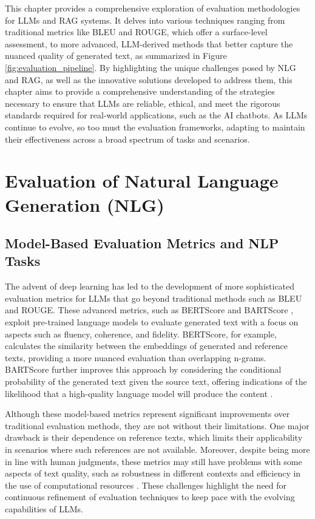 This chapter provides a comprehensive exploration of evaluation methodologies for LLMs and RAG systems. It delves into various techniques ranging from traditional metrics like BLEU and ROUGE, which offer a surface-level assessment, to more advanced, LLM-derived methods that better capture the nuanced quality of generated text, as summarized in Figure \ref{fig:evaluation_pipeline}. By highlighting the unique challenges posed by NLG and RAG, as well as the innovative solutions developed to address them, this chapter aims to provide a comprehensive understanding of the strategies necessary to ensure that LLMs are reliable, ethical, and meet the rigorous standards required for real-world applications, such as the AI chatbots. As LLMs continue to evolve, so too must the evaluation frameworks, adapting to maintain their effectiveness across a broad spectrum of tasks and scenarios.

\section{Evaluation of Natural Language Generation (NLG)}

\subsection{Model-Based Evaluation Metrics and NLP Tasks}

The advent of deep learning has led to the development of more sophisticated evaluation metrics for LLMs that go beyond traditional methods such as BLEU and ROUGE. These advanced metrics, such as BERTScore and BARTScore \cite{zhang2019bertscore, yuan2021bartscore}, exploit pre-trained language models to evaluate generated text with a focus on aspects such as fluency, coherence, and fidelity. BERTScore, for example, calculates the similarity between the embeddings of generated and reference texts, providing a more nuanced evaluation than overlapping n-grams. BARTScore further improves this approach by considering the conditional probability of the generated text given the source text, offering indications of the likelihood that a high-quality language model will produce the content \cite{gao2023retrieval}.

Although these model-based metrics represent significant improvements over traditional evaluation methods, they are not without their limitations. One major drawback is their dependence on reference texts, which limits their applicability in scenarios where such references are not available. Moreover, despite being more in line with human judgments, these metrics may still have problems with some aspects of text quality, such as robustness in different contexts and efficiency in the use of computational resources \cite{he2022blind}. These challenges highlight the need for continuous refinement of evaluation techniques to keep pace with the evolving capabilities of LLMs.

